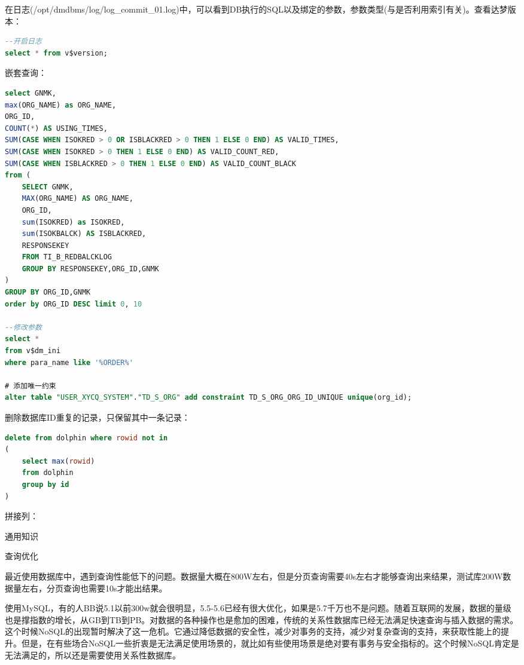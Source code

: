 \documentclass[12pt]{book}
\makeatletter
\numberwithin{dummy}{section}
\theoremstyle{ocrenumbox}
\theoremstyle{blacknumex}
\theoremstyle{blacknumbox}
\theoremstyle{ocrenum}
\renewcommand{\section}{\@startsection{section}{1}{\z@}
	{-4ex \@plus -1ex \@minus -.4ex}
	{1ex \@plus.2ex }
	{\normalfont\large\sffamily\bfseries}}
\renewcommand{\subsection}{\@startsection {subsection}{2}{\z@}
	{-3ex \@plus -0.1ex \@minus -.4ex}
	{0.5ex \@plus.2ex }
	{\normalfont\sffamily\bfseries}}
\makeatother
\begin{document}
在日志(/opt/dmdbms/log/log\_commit\_01.log)中，可以看到DB执行的SQL以及绑定的参数，参数类型(与是否利用索引有关)。查看达梦版本：

\begin{lstlisting}[language=SQL]
--开启日志
select * from v$version;
\end{lstlisting}

嵌套查询：

\begin{lstlisting}[language=SQL]
select GNMK,
max(ORG_NAME) as ORG_NAME,
ORG_ID,
COUNT(*) AS USING_TIMES,
SUM(CASE WHEN ISOKRED > 0 OR ISBLACKRED > 0 THEN 1 ELSE 0 END) AS VALID_TIMES,
SUM(CASE WHEN ISOKRED > 0 THEN 1 ELSE 0 END) AS VALID_COUNT_RED,
SUM(CASE WHEN ISBLACKRED > 0 THEN 1 ELSE 0 END) AS VALID_COUNT_BLACK
from (
	SELECT GNMK,
	MAX(ORG_NAME) AS ORG_NAME,
	ORG_ID,
	sum(ISOKRED) as ISOKRED,
	sum(ISOKBALCK) AS ISBLACKRED,
	RESPONSEKEY	
	FROM TI_B_REDBALCKLOG  
	GROUP BY RESPONSEKEY,ORG_ID,GNMK 
)
GROUP BY ORG_ID,GNMK 
order by ORG_ID DESC limit 0, 10

--修改参数
select * 
from v$dm_ini
where para_name like '%ORDER%'

# 添加唯一约束
alter table "USER_XYCQ_SYSTEM"."TD_S_ORG" add constraint TD_S_ORG_ORG_ID_UNIQUE unique(org_id);
\end{lstlisting}

删除数据库ID重复的记录，只保留其中一条记录：

\begin{lstlisting}[language=SQL]
delete from dolphin where rowid not in
(
	select max(rowid) 
	from dolphin 
	group by id
) 
\end{lstlisting}

拼接列：


\section{通用知识}

\subsection{查询优化}

最近使用数据库中，遇到查询性能低下的问题。数据量大概在800W左右，但是分页查询需要40s左右才能够查询出来结果，测试库200W数据量左右，分页查询也需要10s才能出结果。

使用MySQL，有的人BB说5.1以前300w就会很明显，5.5-5.6已经有很大优化，如果是5.7千万也不是问题。随着互联网的发展，数据的量级也是撑指数的增长，从GB到TB到PB。对数据的各种操作也是愈加的困难，传统的关系性数据库已经无法满足快速查询与插入数据的需求。这个时候NoSQL的出现暂时解决了这一危机。它通过降低数据的安全性，减少对事务的支持，减少对复杂查询的支持，来获取性能上的提升。但是，在有些场合NoSQL一些折衷是无法满足使用场景的，就比如有些使用场景是绝对要有事务与安全指标的。这个时候NoSQL肯定是无法满足的，所以还是需要使用关系性数据库。
\end{document}
